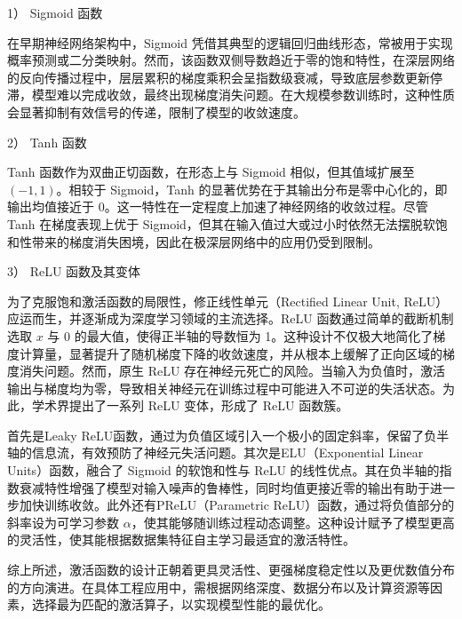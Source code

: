 1） Sigmoid 函数

在早期神经网络架构中，Sigmoid 凭借其典型的逻辑回归曲线形态，常被用于实现概率预测或二分类映射。然而，该函数双侧导数趋近于零的饱和特性，在深层网络的反向传播过程中，层层累积的梯度乘积会呈指数级衰减，导致底层参数更新停滞，模型难以完成收敛，最终出现梯度消失问题。在大规模参数训练时，这种性质会显著抑制有效信号的传递，限制了模型的收敛速度。

2） Tanh 函数

Tanh 函数作为双曲正切函数，在形态上与 Sigmoid 相似，但其值域扩展至 $(-1, 1)$。相较于 Sigmoid，Tanh 的显著优势在于其输出分布是零中心化的，即输出均值接近于 0。这一特性在一定程度上加速了神经网络的收敛过程。尽管 Tanh 在梯度表现上优于 Sigmoid，但其在输入值过大或过小时依然无法摆脱软饱和性带来的梯度消失困境，因此在极深层网络中的应用仍受到限制。

3） ReLU 函数及其变体

为了克服饱和激活函数的局限性，修正线性单元（Rectified Linear Unit, ReLU）应运而生，并逐渐成为深度学习领域的主流选择。ReLU 函数通过简单的截断机制选取 $x$ 与 $0$ 的最大值，使得正半轴的导数恒为 1。这种设计不仅极大地简化了梯度计算量，显著提升了随机梯度下降的收敛速度，并从根本上缓解了正向区域的梯度消失问题。然而，原生 ReLU 存在神经元死亡的风险。当输入为负值时，激活输出与梯度均为零，导致相关神经元在训练过程中可能进入不可逆的失活状态。为此，学术界提出了一系列 ReLU 变体，形成了 ReLU 函数簇。

首先是Leaky ReLU函数，通过为负值区域引入一个极小的固定斜率，保留了负半轴的信息流，有效预防了神经元失活问题。其次是ELU（Exponential Linear Units）函数，融合了 Sigmoid 的软饱和性与 ReLU 的线性优点。其在负半轴的指数衰减特性增强了模型对输入噪声的鲁棒性，同时均值更接近零的输出有助于进一步加快训练收敛。此外还有PReLU（Parametric ReLU）函数，通过将负值部分的斜率设为可学习参数 $\alpha$，使其能够随训练过程动态调整。这种设计赋予了模型更高的灵活性，使其能根据数据集特征自主学习最适宜的激活特性。

综上所述，激活函数的设计正朝着更具灵活性、更强梯度稳定性以及更优数值分布的方向演进。在具体工程应用中，需根据网络深度、数据分布以及计算资源等因素，选择最为匹配的激活算子，以实现模型性能的最优化。

